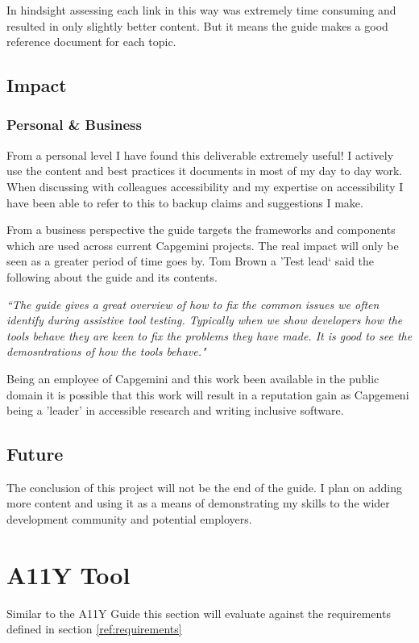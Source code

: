 In hindsight assessing each link in this way was extremely time consuming and
resulted in only slightly better content. But it means the guide makes a good
reference document for each topic.

\subsection{Impact}
\subsubsection{Personal \& Business}
From a personal level I have found this deliverable extremely useful! I
actively use the content and best practices it documents in most of my day to
day work. When discussing with colleagues accessibility and my expertise on
accessibility I have been able to refer to this to backup claims and
suggestions I make.

From a business perspective the guide targets the frameworks and components
which are used across current Capgemini projects. The real impact will
only be seen as a greater period of time goes by. Tom Brown a 'Test lead` said
the following about the guide and its contents.

\begin{center}
\textit{``The guide gives a great overview of how to fix the common issues we
often identify during assistive tool testing. Typically when we show developers
how the tools behave they are keen to fix the problems they have made. It is
good to see the demosntrations of how the tools behave."}
\end{center}

Being an employee of Capgemini and this work been available in the public
domain it is possible that this work will result in a reputation gain as
Capgemeni being a 'leader' in accessible research and writing inclusive
software.

\subsection{Future}
The conclusion of this project will not be the end of the guide. I plan on
adding more content and using it as a means of demonstrating my skills to the
wider development community and potential employers.

\section{A11Y Tool}
Similar to the A11Y Guide this section will evaluate against the requirements
defined in section \ref{ref:requirements}


